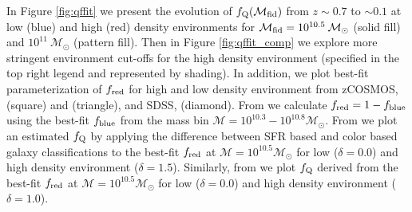 \documentclass{emulateapj}
\begin{document}
In Figure \ref{fig:qffit} we present the evolution of $f_{\rm{Q}}(\mathcal{M}_{\rm{fid}})$ from $z \sim 0.7$ to $\sim 0.1$ at low (blue) and high (red) density environments for $\mathcal{M}_{\rm{fid}} = 10^{10.5} \: \mathcal{M}_{\odot}$ (solid fill) and $10^{11} \: \mathcal{M}_{\odot}$ (pattern fill). Then in Figure \ref{fig:qffit_comp} we explore more stringent environment cut-offs for the high density environment (specified in the top right legend and represented by shading). In addition, we plot best-fit parameterization of $f_{\rm{red}}$ for high and low density environment from zCOSMOS, \cite{Iovino:2010aa} (square) and \cite{Kovac:2014aa} (triangle), and SDSS, \cite{Baldry:2006aa} (diamond). From \cite{Iovino:2010aa} we calculate $f_{\rm{red}} = 1-f_{\rm{blue}}$ using the best-fit $f_{\rm{blue}}$ from the mass bin $\mathcal{M} = 10^{10.3} - 10^{10.8} \mathcal{M}_{\odot}$. From \cite{Kovac:2014aa} we plot an estimated $f_{\rm{Q}}$ by applying the difference between SFR based and color based galaxy classifications to the best-fit $f_{\rm{red}}$ at $\mathcal{M} = 10^{10.5} \mathcal{M}_{\odot}$ for low ($\delta = 0.0$) and high density environment ($\delta = 1.5$). Similarly, from \cite{Baldry:2006aa} we plot $f_{\rm{Q}}$ derived from the best-fit $f_{\rm{red}}$ at $\mathcal{M} = 10^{10.5} \mathcal{M}_{\odot}$ for low ($\delta = 0.0$) and high density environment ($\delta = 1.0$).
\end{document}
